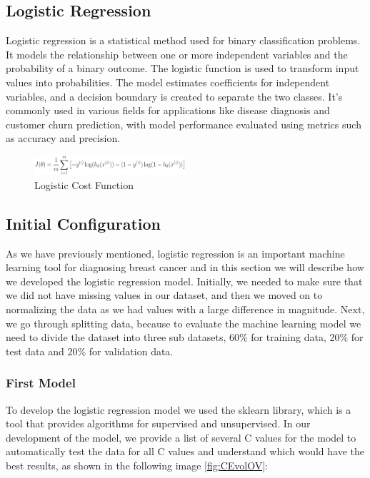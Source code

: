 \documentclass[12pt,a4paper,twocolumn]{article}
\begin{document}
\subsection{Logistic Regression}
Logistic regression is a statistical method used for binary classification problems. It models the relationship between one or more independent variables and the probability of a binary outcome. The logistic function is used to transform input values into probabilities. The model estimates coefficients for independent variables, and a decision boundary is created to separate the two classes. It's commonly used in various fields for applications like disease diagnosis and customer churn prediction, with model performance evaluated using metrics such as accuracy and precision.
\begin{figure}[H]
\includegraphics[width=0.5\textwidth]{images/Screenshot from 2023-11-05 21-14-53.png}
\centering
\caption{\label{fig:cost_func} Logistic Cost Function}
\end{figure}


\subsection{Initial Configuration}
As we have previously mentioned, logistic regression is an important machine learning tool for diagnosing breast cancer and in this section we will describe how we developed the logistic regression model.
Initially, we needed to make sure that we did not have missing values in our dataset, and then we moved on to normalizing the data as we had values with a large difference in magnitude. Next, we go through splitting data, because to evaluate the machine learning model we need to divide the dataset into three sub datasets, 60\% for training data, 20\% for test data and 20\% for validation data.

\subsubsection{First Model}
To develop the logistic regression model we used the sklearn library, which is a tool that provides algorithms for supervised and unsupervised.
In our development of the model, we provide a list of several C values for the model to automatically test the data for all C values and understand which would have the best results, as shown in the following image \ref{fig:CEvolOV}:
\end{document}
